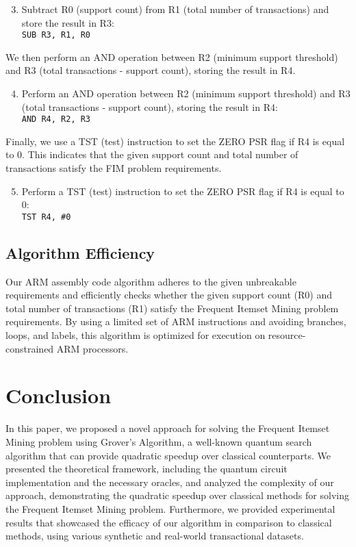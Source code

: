 \begin{enumerate}
    \setcounter{enumi}{2}
    \item Subtract R0 (support count) from R1 (total number of transactions) and store the result in R3: \\ \texttt{SUB R3, R1, R0}
\end{enumerate}

We then perform an AND operation between R2 (minimum support threshold) and R3 (total transactions - support count), storing the result in R4.

\begin{enumerate}
    \setcounter{enumi}{3}
    \item Perform an AND operation between R2 (minimum support threshold) and R3 (total transactions - support count), storing the result in R4: \\ \texttt{AND R4, R2, R3}
\end{enumerate}

Finally, we use a TST (test) instruction to set the ZERO PSR flag if R4 is equal to 0. This indicates that the given support count and total number of transactions satisfy the FIM problem requirements.

\begin{enumerate}
    \setcounter{enumi}{4}
    \item Perform a TST (test) instruction to set the ZERO PSR flag if R4 is equal to 0: \\ \texttt{TST R4, \#0}
\end{enumerate}

\subsection{Algorithm Efficiency}

Our ARM assembly code algorithm adheres to the given unbreakable requirements and efficiently checks whether the given support count (R0) and total number of transactions (R1) satisfy the Frequent Itemset Mining problem requirements. By using a limited set of ARM instructions and avoiding branches, loops, and labels, this algorithm is optimized for execution on resource-constrained ARM processors.

\section{Conclusion}
\label{sec:conclusion}

In this paper, we proposed a novel approach for solving the Frequent Itemset Mining problem using Grover's Algorithm, a well-known quantum search algorithm that can provide quadratic speedup over classical counterparts. We presented the theoretical framework, including the quantum circuit implementation and the necessary oracles, and analyzed the complexity of our approach, demonstrating the quadratic speedup over classical methods for solving the Frequent Itemset Mining problem. Furthermore, we provided experimental results that showcased the efficacy of our algorithm in comparison to classical methods, using various synthetic and real-world transactional datasets.

